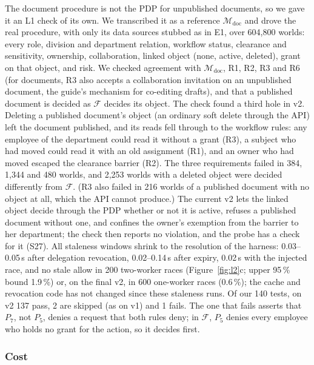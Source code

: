 \documentclass[sigconf,review,anonymous]{acmart}
\begin{document}
The document procedure is not the PDP for unpublished documents, so we gave it an L1 check of its own. We
transcribed it as a reference $\mathcal{M}_{\mathrm{doc}}$ and drove the real procedure, with only its data
sources stubbed as in E1, over 604{,}800 worlds: every role, division and department relation, workflow status,
clearance and sensitivity, ownership, collaboration, linked object (none, active, deleted), grant on that object,
and risk. We checked agreement with $\mathcal{M}_{\mathrm{doc}}$, R1, R2, R3 and R6 (for documents, R3 also accepts
a collaboration invitation on an unpublished document, the guide's mechanism for co-editing drafts), and that a
published document is decided as $\mathcal{F}$ decides its object. The check found a third hole in v2. Deleting a
published document's object (an ordinary soft delete through the API) left the document published, and its reads
fell through to the workflow rules: any employee of the department could read it without a grant (R3), a subject
who had moved could read it with an old assignment (R1), and an owner who had moved escaped the clearance barrier
(R2). The three requirements failed in 384, 1{,}344 and 480 worlds, and 2{,}253 worlds with a deleted object were
decided differently from $\mathcal{F}$. (R3 also failed in 216 worlds of a published document with no object at
all, which the API cannot produce.) The current v2 lets the linked object decide through the PDP whether or not it is
active, refuses a published document without one, and confines the owner's exemption from the barrier to her
department; the check then reports no violation, and the probe has a check for it (S27). All staleness windows shrink to the
resolution of the harness: 0.03--0.05\,s after delegation revocation, 0.02--0.14\,s after expiry, 0.02\,s with the
injected race, and no stale allow in 200 two-worker races (Figure~\ref{fig:l2}c; upper 95\,\% bound 1.9\,\%) or,
on the final v2, in 600 one-worker races (0.6\,\%); the cache and revocation code has not changed since these staleness runs. Of our 140 tests, on v2
137 pass, 2 are skipped (as on v1) and 1 fails. The one that fails asserts that $P_7$, not $P_5$, denies a request
that both rules deny; in $\mathcal{F}$, $P_5$ denies every employee who holds no grant for the action, so it
decides first.

\subsubsection{Cost}
\end{document}
